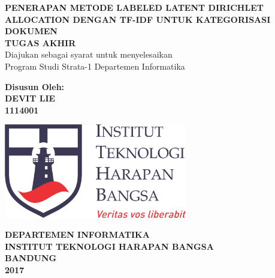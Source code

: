 \begin{titlepage}
\begin{center}
	\onehalfspacing
	{\large \bfseries PENERAPAN METODE LABELED LATENT DIRICHLET ALLOCATION DENGAN TF-IDF UNTUK KATEGORISASI DOKUMEN\\
	\vspace{1.5cm}
	 \large TUGAS AKHIR}\\
           Diajukan sebagai syarat untuk menyelesaikan\\ Program Studi Strata-1 Departemen Informatika

	\vspace{1.5cm}
          {\bfseries Disusun Oleh: \\
           DEVIT LIE \\
	1114001}
	
	\vspace{1.5cm}
	\includegraphics[width=8cm]{images/ithb.png}
	
	
	\vspace{3.5cm}
	
{\large \bfseries DEPARTEMEN INFORMATIKA \\
INSTITUT TEKNOLOGI HARAPAN BANGSA \\
BANDUNG\\
2017}

	
\end{center}

\end{titlepage}

\newpage